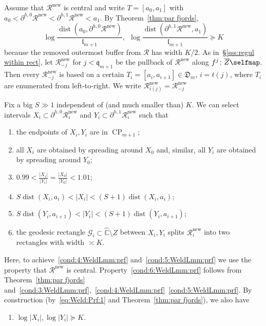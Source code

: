 \documentclass{amsart}
\renewcommand{\sp}{{\ \ }}
\newcommand{\1}{{\mathbb 1 }}
\newcommand{\FamG}{{\mathcal G}}
\newcommand\RR{\mathcal{R}}
\newcommand{\qq}{\mathfrak{q}}
\newcommand{\length}{{\mathfrak l}}
\newcommand\new{{\operatorname{new}}}
\newcommand{\wC}{\widehat{\mathbb{C}}}
\newcommand{\Dbb}{{\mathfrak{D}}}
\theoremstyle{remark}
\numberwithin{equation}{section}
\theoremstyle{definition}
\newcommand{\dist}{\operatorname{dist}}
\newcommand{\CP}{{\operatorname{CP}}}
\begin{document}
Assume that $\RR^\new$ is central and write $T=[a_0,a_1]$ with $a_0< \partial ^{h,0} \RR^\new<\partial ^{h,1}\RR^\new< a_1$. By Theorem~\ref{thm:par fjords},
\begin{equation}
\label{eq:Weld:Prf:1}
\log \frac{\dist (a_0, \partial ^{h,0}\RR^\new)}{\length_{m+1}} ,\sp  \log \frac{\dist (\partial ^{h,1}\RR^\new, a_1)}{\length_{m+1}} \succeq K  
\end{equation}
because the removed outermost buffer from $\RR$ has width $K/2$. As in~\S\ref{sss:regul within rect}, let $\RR^\new_{-j}$ for $j<\qq_{m+1}$ be the pullback of $\RR^\new$ along $f^j\colon \overline Z\selfmap$. Then every $\RR^\new_{-j}$ is based on a certain $T_{i}=[a_i,a_{i+1}]\in \Dbb_m$, $i=t(j)$, where $T_i$ are enumerated from left-to-right. We write $\RR^\new_{i(j)}=\RR^\new_{-j}$


Fix a big $S\gg 1$ independent of (and much smaller than) $K$. We can select intervals $X_i\subset \partial ^{h,0} \RR^\new_i$ and $Y_i\subset \partial^{h,1}\RR^\new_i$ such that 
\begin{enumerate}[label=\text{(\Alph*)},font=\normalfont,leftmargin=*]
\item \label{cond:1:WeldLmm:prf}the endpoints of $ X_i,Y_i$ are in $\CP_{m+1}$;
\item all $X_i$ are obtained by spreading around $X_0$ and, similar, all $Y_i$ are obtained by spreading around $Y_0$;
\item \label{cond:2:WeldLmm:prf}$0.99<\frac {|X_i|}{ |Y_i|}=\frac {|X_0|}{ |Y_0|}<1.01$;
\item \label{cond:3:WeldLmm:prf}$S \dist(X_i , a_i)<|X_i|<(S+1) \dist(X_i , a_i)$;
\item \label{cond:4:WeldLmm:prf}$S \dist(Y_i , a_{i+1})<|Y_i|<(S+1) \dist(Y_i , a_{i+1})$;
\item \label{cond:5:WeldLmm:prf} the geodesic rectangle $\FamG_i\subset \wC\setminus Z$ between $X_i, Y_i$ splits $\RR^\new_i$ into two rectangles with width $\asymp K$. 
 \end{enumerate}
 
 \noindent Here, to achieve~\ref{cond:4:WeldLmm:prf} and~\ref{cond:5:WeldLmm:prf} we use the property that $\RR^\new$ is central. Property~\ref{cond:6:WeldLmm:prf} follows from Theorem~\ref{thm:par fjords} and~\ref{cond:3:WeldLmm:prf},~\ref{cond:4:WeldLmm:prf}~\ref{cond:5:WeldLmm:prf}. By construction (by~\eqref{eq:Weld:Prf:1} and Theorem~\ref{thm:par fjords}), we also have
\begin{enumerate}[label=\text{(\Alph*)},start = 6,font=\normalfont,leftmargin=*]
\item \label{cond:6:WeldLmm:prf} $\log|X_i|, \log |Y_i| \succeq K$.  
 \end{enumerate}
\end{document}
